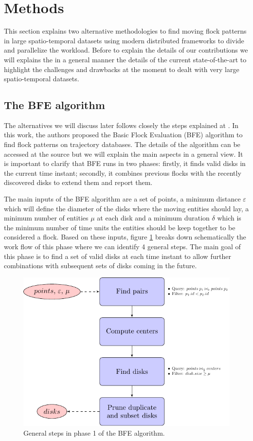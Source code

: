 
\section{Methods}
This section explains two alternative methodologies to find moving flock patterns in large spatio-temporal datasets using modern distributed frameworks to divide and parallelize the workload.  Before to explain the details of our contributions we will explains the in a general manner the details of the current state-of-the-art to highlight the challenges and drawbacks at the moment to dealt with very large spatio-temporal datasets.

\subsection{The BFE algorithm}
The alternatives we will discuss later follows closely the steps explained at \cite{vieira_2009}.  In this work, the authors proposed the Basic Flock Evaluation (BFE) algorithm to find flock patterns on trajectory databases.  The details of the algorithm can be accessed at the source but we will explain the main aspects in a general view.  It is important to clarify that BFE runs in two phases: firstly, it finds valid disks in the current time instant; secondly, it combines previous flocks with the recently discovered disks to extend them and report them.  

The main inputs of the BFE algorithm are a set of points, a minimum distance $\varepsilon$ which will define the diameter of the disks where the moving entities should lay, a minimum number of entities $\mu$ at each disk and a minimum duration $\delta$ which is the minimum number of time units the entities should be keep together to be considered a flock.  Based on these inputs,  figure \ref{fig:MF_flowchart} breaks down schematically the work flow  of this phase where we can identify 4 general steps.  The main goal of this phase is to find a set of valid disks at each time instant to allow further combinations with subsequent sets of disks coming in the future.

\begin{figure}
    \centering
    \includegraphics[width=\linewidth]{figures/MF_flowchart}
    \caption{General steps in phase 1 of the BFE algorithm.}\label{fig:MF_flowchart}
\end{figure}


